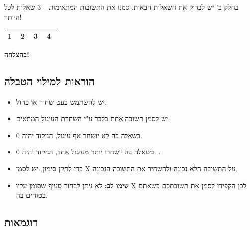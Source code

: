 \documentclass[12pt, a4paper]{article}
\begin{document}
 בחלק ב' יש לבדוק את השאלות הבאות. סמנו את התשובות המתאימות --  3 שאלות לכל היותר!


\begin{center}
\setlength{\arrayrulewidth}{0.6pt}
\renewcommand{\arraystretch}{1.4}
\begin{tabular}{|c|c|c|c|}
\hline
\textcircled{1} & \textcircled{2} & \textcircled{3} & \textcircled{4}\\
\hline
\end{tabular}
\end{center}

\begin{center}
\huge{\textbf{בהצלחה!}}
\end{center}
\pagebreak
\subsection*{הוראות למילוי הטבלה}
\begin{itemize}
    \item[$\bullet$] יש להשתמש בעט שחור או כחול. 
    \item[$\bullet$] יש לסמן תשובה אחת בלבד ע"י השחרת העיגול המתאים.
    \item[$\bullet$]
    בשאלה בה לא יושחר אף עיגול,
    הניקוד יהיה 0.
    \item[$\bullet$] בשאלה בה יושחרו יותר מעיגול אחד, הניקוד יהיה 0.
.
    \item[$\bullet$] כדי לתקן סימון, יש לסמן X
    על התשובה הלא נכונה ולהשחיר את התשובה הנכונה.

    \item[$\bullet$]
    \textbf{שימו לב:}
    לא ניתן לבחור סעיף שסומן עליו X
    לכן הקפידו לסמן את תשובתכם כשאתם בטוחים בה.
\end{itemize}

\subsection*{דוגמאות}
\end{document}
